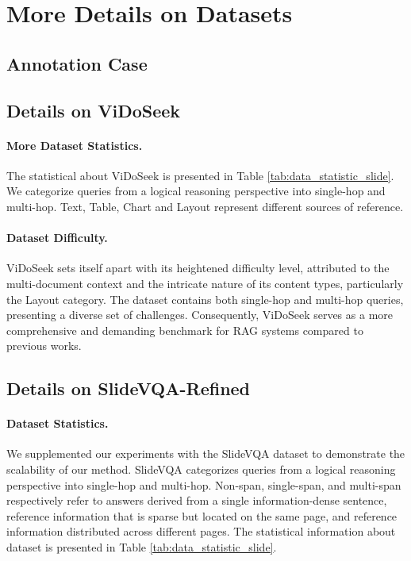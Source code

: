 \section{More Details on Datasets}
\label{appendix:dataset_composition}

\subsection{Annotation Case}


\subsection{Details on ViDoSeek}
\paragraph{More Dataset Statistics.}
The statistical about ViDoSeek is presented in Table \ref{tab:data_statistic_slide}. We categorize queries from a logical reasoning perspective into single-hop and multi-hop. Text, Table, Chart and Layout represent different sources of reference.

\paragraph{Dataset Difficulty.}
ViDoSeek sets itself apart with its heightened difficulty level, attributed to the multi-document context and the intricate nature of its content types, particularly the Layout category. The dataset contains both single-hop and multi-hop queries, presenting a diverse set of challenges. Consequently, ViDoSeek serves as a more comprehensive and demanding benchmark for RAG systems compared to previous works.

\subsection{Details on SlideVQA-Refined}
\paragraph{Dataset Statistics.}
We supplemented our experiments with the SlideVQA dataset to demonstrate the scalability of our method. 
SlideVQA categorizes queries from a logical reasoning perspective into single-hop and multi-hop. 
Non-span, single-span, and multi-span respectively refer to answers derived from a single information-dense sentence, reference information that is sparse but located on the same page, and reference information distributed across different pages.
The statistical information about dataset is presented in Table \ref{tab:data_statistic_slide}.

